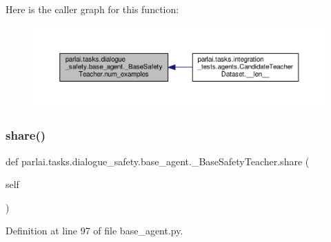 Here is the caller graph for this function\+:
\nopagebreak
\begin{figure}[H]
\begin{center}
\leavevmode
\includegraphics[width=350pt]{classparlai_1_1tasks_1_1dialogue__safety_1_1base__agent_1_1__BaseSafetyTeacher_a8f42bbbc9060a3afaf53cc5c125e1bd7_icgraph}
\end{center}
\end{figure}
\mbox{\label{classparlai_1_1tasks_1_1dialogue__safety_1_1base__agent_1_1__BaseSafetyTeacher_a563ca65dea3b938cf25a4e4853d23c62}} 
\subsubsection{\texorpdfstring{share()}{share()}}
{\footnotesize\ttfamily def parlai.\+tasks.\+dialogue\+\_\+safety.\+base\+\_\+agent.\+\_\+\+Base\+Safety\+Teacher.\+share (\begin{DoxyParamCaption}\item[{}]{self }\end{DoxyParamCaption})}



Definition at line 97 of file base\+\_\+agent.\+py.



